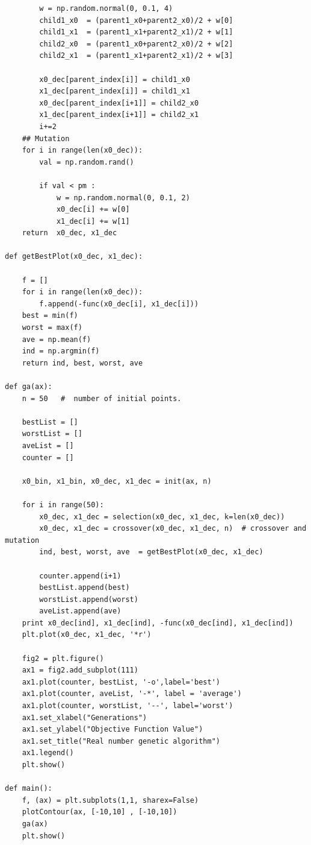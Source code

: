 \documentclass{article}
\begin{document}
\begin{lstlisting}
        w = np.random.normal(0, 0.1, 4)
        child1_x0  = (parent1_x0+parent2_x0)/2 + w[0]
        child1_x1  = (parent1_x1+parent2_x1)/2 + w[1]
        child2_x0  = (parent1_x0+parent2_x0)/2 + w[2]
        child2_x1  = (parent1_x1+parent2_x1)/2 + w[3]

        x0_dec[parent_index[i]] = child1_x0
        x1_dec[parent_index[i]] = child1_x1
        x0_dec[parent_index[i+1]] = child2_x0
        x1_dec[parent_index[i+1]] = child2_x1
        i+=2
    ## Mutation
    for i in range(len(x0_dec)):
        val = np.random.rand()

        if val < pm :
            w = np.random.normal(0, 0.1, 2)
            x0_dec[i] += w[0]
            x1_dec[i] += w[1]
    return  x0_dec, x1_dec

def getBestPlot(x0_dec, x1_dec):

    f = []
    for i in range(len(x0_dec)):
        f.append(-func(x0_dec[i], x1_dec[i]))
    best = min(f)
    worst = max(f)
    ave = np.mean(f)
    ind = np.argmin(f)
    return ind, best, worst, ave

def ga(ax):
    n = 50   #  number of initial points.

    bestList = []
    worstList = []
    aveList = []
    counter = []

    x0_bin, x1_bin, x0_dec, x1_dec = init(ax, n)

    for i in range(50):
        x0_dec, x1_dec = selection(x0_dec, x1_dec, k=len(x0_dec))
        x0_dec, x1_dec = crossover(x0_dec, x1_dec, n)  # crossover and mutation
        ind, best, worst, ave  = getBestPlot(x0_dec, x1_dec)

        counter.append(i+1)
        bestList.append(best)
        worstList.append(worst)
        aveList.append(ave)
    print x0_dec[ind], x1_dec[ind], -func(x0_dec[ind], x1_dec[ind])
    plt.plot(x0_dec, x1_dec, '*r')

    fig2 = plt.figure()
    ax1 = fig2.add_subplot(111)
    ax1.plot(counter, bestList, '-o',label='best')
    ax1.plot(counter, aveList, '-*', label = 'average')
    ax1.plot(counter, worstList, '--', label='worst')
    ax1.set_xlabel("Generations")
    ax1.set_ylabel("Objective Function Value")
    ax1.set_title("Real number genetic algorithm")
    ax1.legend()
    plt.show()

def main():
    f, (ax) = plt.subplots(1,1, sharex=False)
    plotContour(ax, [-10,10] , [-10,10])
    ga(ax)
    plt.show()

\end{lstlisting}
\end{document}

